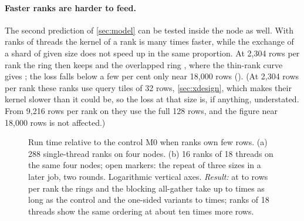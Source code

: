 \paragraph{Faster ranks are harder to feed.} The second prediction of
\cref{sec:model} can be tested inside the node as well. With  ranks of
 threads the kernel of a rank is many times faster, while the
exchange of a shard of given size does not speed up in the same proportion. At
2{,}304 rows per rank the ring
then keeps  and the overlapped ring
, where the thin-rank curve gives ; the
loss falls below a few per cent only near 18{,}000 rows
(). (At 2{,}304 rows per rank these ranks use query tiles
of 32 rows, \cref{sec:xdesign}, which makes their kernel slower than it could be,
so the loss at that size is, if anything, understated. From 9{,}216 rows per rank
on they use the full 128 rows, and the figure near 18{,}000 rows is not affected.)

\begin{figure}[t]
\centering
{}
\caption{Run time relative to the control M0 when ranks own few rows. (a) 288
single-thread ranks on four nodes. (b) 16 ranks of 18 threads on the same four
nodes; open markers: the repeat of three sizes in a later job, two rounds.
Logarithmic vertical axes. \emph{Result:} at  to
 rows per rank the rings and the blocking all-gather take up to
 times as long as the control and the one-sided
variants  to  times; ranks of
18 threads show the same ordering at about ten times more rows.}
\label{fig:smallc}
\end{figure}

